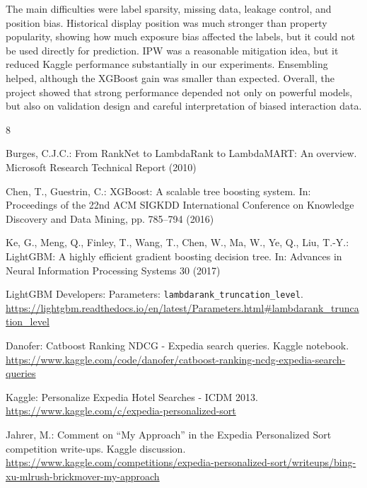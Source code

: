 \documentclass[runningheads]{llncs}
\begin{document}
The main difficulties were label sparsity, missing data, leakage control, and position bias.  Historical display position was much stronger than property popularity, showing how much exposure bias affected the labels, but it could not be used directly for prediction.  IPW was a reasonable mitigation idea, but it reduced Kaggle performance substantially in our experiments.  Ensembling helped, although the XGBoost gain was smaller than expected.  Overall, the project showed that strong performance depended not only on powerful models, but also on validation design and careful interpretation of biased interaction data.

\begin{thebibliography}{8}

Burges, C.J.C.:
From RankNet to LambdaRank to LambdaMART: An overview.
Microsoft Research Technical Report (2010)

Chen, T., Guestrin, C.:
XGBoost: A scalable tree boosting system.
In: Proceedings of the 22nd ACM SIGKDD International Conference on Knowledge Discovery and Data Mining, pp. 785--794 (2016)

Ke, G., Meng, Q., Finley, T., Wang, T., Chen, W., Ma, W., Ye, Q., Liu, T.-Y.:
LightGBM: A highly efficient gradient boosting decision tree.
In: Advances in Neural Information Processing Systems 30 (2017)

LightGBM Developers:
Parameters: \texttt{lambdarank\_truncation\_level}.
\url{https://lightgbm.readthedocs.io/en/latest/Parameters.html#lambdarank_truncation_level}

Danofer:
Catboost Ranking NDCG - Expedia search queries.
Kaggle notebook.
\url{https://www.kaggle.com/code/danofer/catboost-ranking-ncdg-expedia-search-queries}

Kaggle:
Personalize Expedia Hotel Searches - ICDM 2013.
\url{https://www.kaggle.com/c/expedia-personalized-sort}

Jahrer, M.:
Comment on ``My Approach'' in the Expedia Personalized Sort competition write-ups.
Kaggle discussion.
\url{https://www.kaggle.com/competitions/expedia-personalized-sort/writeups/bing-xu-mlrush-brickmover-my-approach}

\end{thebibliography}
\end{document}

